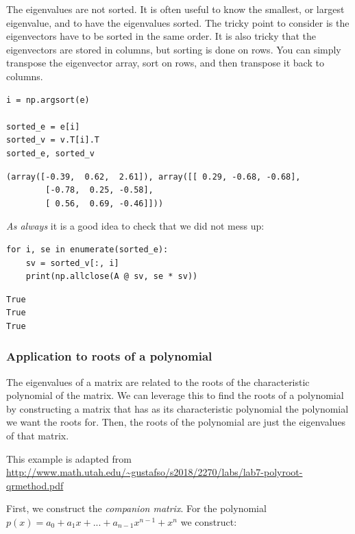 \documentclass[11pt]{article}
\begin{document}
The eigenvalues are not sorted. It is often useful to know the smallest, or largest eigenvalue, and to have the eigenvalues sorted. The tricky point to consider is the eigenvectors have to be sorted in the same order. It is also tricky that the eigenvectors are stored in columns, but sorting is done on rows. You can simply transpose the eigenvector array, sort on rows, and then transpose it back to columns.

\begin{verbatim}
i = np.argsort(e)

sorted_e = e[i]
sorted_v = v.T[i].T
sorted_e, sorted_v
\end{verbatim}

\begin{verbatim}
(array([-0.39,  0.62,  2.61]), array([[ 0.29, -0.68, -0.68],
        [-0.78,  0.25, -0.58],
        [ 0.56,  0.69, -0.46]]))
\end{verbatim}

\emph{As always} it is a good idea to check that we did not mess up:

\begin{verbatim}
for i, se in enumerate(sorted_e):
    sv = sorted_v[:, i]
    print(np.allclose(A @ sv, se * sv))
\end{verbatim}

\begin{verbatim}
True
True
True

\end{verbatim}



\subsubsection{Application to roots of a polynomial}
\label{sec:org2879d19}

The eigenvalues of a matrix are related to the roots of the characteristic polynomial of the matrix. We can leverage this to find the roots of a polynomial by constructing a matrix that has as its characteristic polynomial the polynomial we want the roots for. Then, the roots of the polynomial are just the eigenvalues of that matrix.

This example is adapted from \url{http://www.math.utah.edu/\~gustafso/s2018/2270/labs/lab7-polyroot-qrmethod.pdf}

First, we construct the \emph{companion matrix}. For the polynomial \(p(x) = a_0 + a_1 x + ... + a_{n-1} x^{n-1} + x^n\) we construct:
\end{document}
